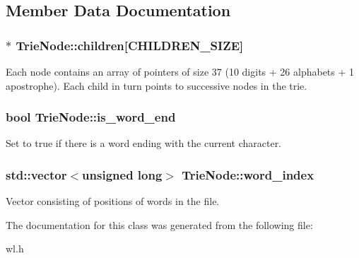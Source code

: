 \subsection{Member Data Documentation}
\hypertarget{classTrieNode_a69ae75c32241f3f6b49f3aad6e6fb6f2}{
\subsubsection[{children}]{$\ast$ Trie\-Node\-::children\mbox{[}C\-H\-I\-L\-D\-R\-E\-N\-\_\-\-S\-I\-Z\-E\mbox{]}}}\label{classTrieNode_a69ae75c32241f3f6b49f3aad6e6fb6f2}
Each node contains an array of pointers of size 37 (10 digits + 26 alphabets + 1 apostrophe). Each child in turn points to successive nodes in the trie. \hypertarget{classTrieNode_a14983627e54ef24a0963d2836755dcaf}{
\subsubsection[{is\-\_\-word\-\_\-end}]{\setlength{\rightskip}{0pt plus 5cm}bool Trie\-Node\-::is\-\_\-word\-\_\-end}}\label{classTrieNode_a14983627e54ef24a0963d2836755dcaf}
Set to true if there is a word ending with the current character. \hypertarget{classTrieNode_a2f0a51cb24bc20bdc6f368c1fef53e67}{
\subsubsection[{word\-\_\-index}]{\setlength{\rightskip}{0pt plus 5cm}std\-::vector$<$unsigned long$>$ Trie\-Node\-::word\-\_\-index}}\label{classTrieNode_a2f0a51cb24bc20bdc6f368c1fef53e67}
Vector consisting of positions of words in the file. 

The documentation for this class was generated from the following file\-:\begin{DoxyCompactItemize}
\item 
wl.\-h\end{DoxyCompactItemize}
